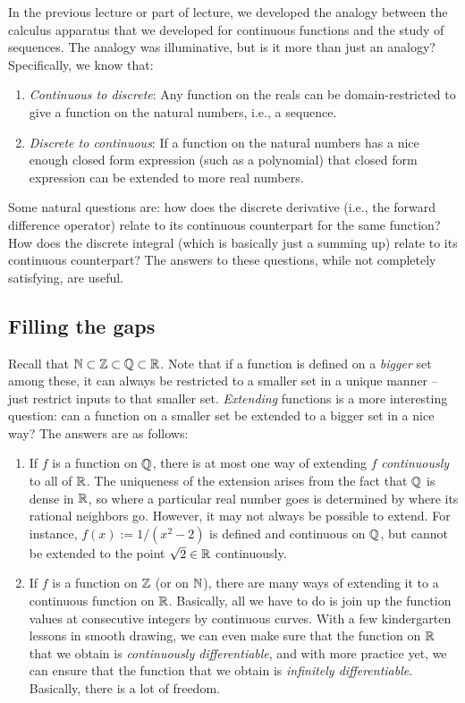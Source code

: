 \documentclass[10pt]{amsart}
\begin{document}
In the previous lecture or part of lecture, we developed the analogy
between the calculus apparatus that we developed for continuous
functions and the study of sequences. The analogy was illuminative,
but is it more than just an analogy? Specifically, we know that:

\begin{enumerate}
\item {\em Continuous to discrete}: Any function on the reals can be
  domain-restricted to give a function on the natural numbers, i.e., a
  sequence.
\item {\em Discrete to continuous}: If a function on the natural
  numbers has a nice enough closed form expression (such as a
  polynomial) that closed form expression can be extended to more real
  numbers.
\end{enumerate}

Some natural questions are: how does the discrete derivative (i.e.,
the forward difference operator) relate to its continuous counterpart
for the same function? How does the discrete integral (which is
basically just a summing up) relate to its continuous counterpart? The
answers to these questions, while not completely satisfying, are
useful.

\subsection{Filling the gaps}

Recall that $\mathbb{N} \subset \mathbb{Z} \subset \mathbb{Q} \subset \mathbb{R}$. Note that if a
function is defined on a {\em bigger} set among these, it can always
be restricted to a smaller set in a unique manner -- just restrict
inputs to that smaller set. {\em Extending} functions is a more
interesting question: can a function on a smaller set be extended to a
bigger set in a nice way? The answers are as follows:

\begin{enumerate}
\item If $f$ is a function on $\mathbb{Q}$, there is at most one way of
  extending $f$ {\em continuously} to all of $\mathbb{R}$. The uniqueness of
  the extension arises from the fact that $\mathbb{Q}$ is dense in $\mathbb{R}$, so
  where a particular real number goes is determined by where its
  rational neighbors go. However, it may not always be possible to
  extend. For instance, $f(x) := 1/(x^2 - 2)$ is defined and
  continuous on $\mathbb{Q}$, but cannot be extended to the point $\sqrt{2}
  \in \mathbb{R}$ continuously.
\item If $f$ is a function on $\mathbb{Z}$ (or on $\mathbb{N}$), there are many ways
  of extending it to a continuous function on $\mathbb{R}$. Basically, all we
  have to do is join up the function values at consecutive integers by
  continuous curves. With a few kindergarten lessons in smooth
  drawing, we can even make sure that the function on $\mathbb{R}$ that we
  obtain is {\em continuously differentiable}, and with more practice
  yet, we can ensure that the function that we obtain is {\em
  infinitely differentiable}. Basically, there is a lot of freedom.
\end{enumerate}
\end{document}
